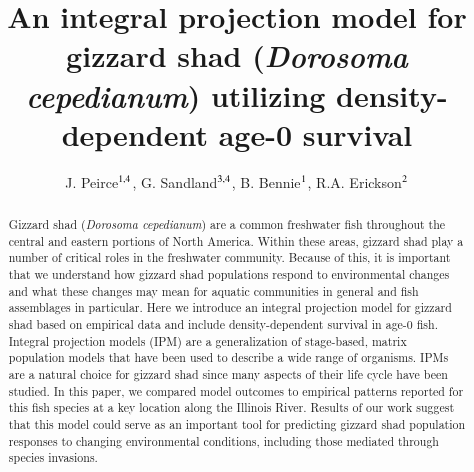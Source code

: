 \documentclass[preprint,review,12pt,authoryear]{elsarticle}
\begin{document}
\linenumbers
\begin{frontmatter}


\title{An integral projection model for gizzard shad (\emph{Dorosoma cepedianum}) utilizing density-dependent age-0 survival}

\author{ J. Peirce$^{\rm 1,4}$,  G.  Sandland$^{\rm 3,4}$, B. Bennie$^{\rm 1}$, R.A. Erickson$^{\rm 2}$}
\address{
${\rm 1}$ University of Wisconsin - La Crosse, Mathematics \& Statistics Department\\ 
${\rm 2}$ U.S.G.S. Upper Mississippi Environmental Science Center\\ 
${\rm 3}$ University of Wisconsin - La Crosse, Biology Department\\
${\rm 4}$ River Studies Center} 

\begin{abstract}
Gizzard shad (\emph{Dorosoma cepedianum}) are a common freshwater fish throughout the central and eastern portions of North America. 
Within these areas, gizzard shad play a number of critical roles in the freshwater community. 
Because of this, it is important that we understand how gizzard shad populations respond to environmental changes and what these changes may mean for aquatic communities in general and fish assemblages in particular. 
Here we introduce an integral projection model for gizzard shad based on empirical data and include density-dependent survival in age-0 fish. 
Integral projection models (IPM) are a generalization of stage-based, matrix population models that have been used to describe a wide range of organisms. 
IPMs are a natural choice for gizzard shad since many aspects of their life cycle have been studied. 
In this paper, we compared model outcomes to empirical patterns reported for this fish species at a key location along the Illinois River. 
Results of our work suggest that this model could serve as an important tool for predicting gizzard shad population responses to changing environmental conditions, including those mediated through species invasions.
\end{abstract}

\begin{graphicalabstract}
\begin{figure}
    \begin{center}
\begin{tikzpicture}[->,>=stealth',shorten >=1pt,auto,node distance=3cm,
  thick,
  main node/.style={rectangle,draw},
  box/.style = {draw=gray, very thick,
                            minimum height=11mm, text width=11mm, 
                            align=center},]
                              

\end{tikzpicture}
\end{center}
\end{figure}
\end{graphicalabstract}
\end{frontmatter}
\end{document}
